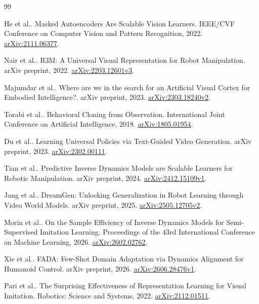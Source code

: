 \documentclass[11pt]{article}
\begin{document}
\clearpage

\begin{thebibliography}{99}

\small

 He et al.. Masked Autoencoders Are Scalable Vision Learners. IEEE/CVF Conference on Computer Vision and Pattern Recognition, 2022. \href{https://arxiv.org/abs/2111.06377}{arXiv:2111.06377}.

 Nair et al.. R3M: A Universal Visual Representation for Robot Manipulation. arXiv preprint, 2022. \href{https://arxiv.org/abs/2203.12601v3}{arXiv:2203.12601v3}.

 Majumdar et al.. Where are we in the search for an Artificial Visual Cortex for Embodied Intelligence?. arXiv preprint, 2023. \href{https://arxiv.org/abs/2303.18240v2}{arXiv:2303.18240v2}.

 Torabi et al.. Behavioral Cloning from Observation. International Joint Conference on Artificial Intelligence, 2018. \href{https://arxiv.org/abs/1805.01954}{arXiv:1805.01954}.

 Du et al.. Learning Universal Policies via Text-Guided Video Generation. arXiv preprint, 2023. \href{https://arxiv.org/abs/2302.00111}{arXiv:2302.00111}.

 Tian et al.. Predictive Inverse Dynamics Models are Scalable Learners for Robotic Manipulation. arXiv preprint, 2024. \href{https://arxiv.org/abs/2412.15109v1}{arXiv:2412.15109v1}.

 Jang et al.. DreamGen: Unlocking Generalization in Robot Learning through Video World Models. arXiv preprint, 2025. \href{https://arxiv.org/abs/2505.12705v2}{arXiv:2505.12705v2}.

 Morin et al.. On the Sample Efficiency of Inverse Dynamics Models for Semi-Supervised Imitation Learning. Proceedings of the 43rd International Conference on Machine Learning, 2026. \href{https://arxiv.org/abs/2602.02762}{arXiv:2602.02762}.

 Xie et al.. FADA: Few-Shot Domain Adaptation via Dynamics Alignment for Humanoid Control. arXiv preprint, 2026. \href{https://arxiv.org/abs/2606.28476v1}{arXiv:2606.28476v1}.

 Pari et al.. The Surprising Effectiveness of Representation Learning for Visual Imitation. Robotics: Science and Systems, 2022. \href{https://arxiv.org/abs/2112.01511}{arXiv:2112.01511}.


\end{thebibliography}
\end{document}
